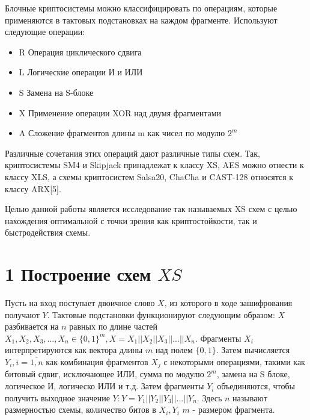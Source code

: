 \documentclass[a4paper,12pt]{extarticle}
\begin{document}
\begin{large}
Блочные криптосистемы можно классифицировать по операциям, которые применяются в тактовых подстановках на каждом фрагменте. Используют следующие операции:

\begin{itemize}
\item R
\newline Операция циклического сдвига
\item L
\newline Логические операции И и ИЛИ
\item S
\newline Замена на S-блоке
\item X
\newline Применение операции XOR над двумя фрагментами
\item A
\newline Сложение фрагментов длины m как чисел по модулю $2^m$
\end{itemize}

Различные сочетания этих операций дают различные типы схем. Так, криптосистемы SM4 и Skipjack принадлежат к классу XS, AES можно отнести к классу XLS, а схемы криптосистем Salsa20, ChaCha и CAST-128 относятся к классу ARX[5].

Целью данной работы является исследование так называемых XS схем с целью нахождения оптимальной с точки зрения как криптостойкости, так и быстродействия схемы.


\newpage
\section*{1 Построение схем $XS$}
\vspace*{1cm}

Пусть на вход поступает двоичное слово $X$, из которого в ходе зашифрования получают $Y$. Тактовые подстановки функционируют следующим образом: $X$ разбивается на $n$ равных по длине частей $X_1, X_2, X_3, ..., X_n \in \{0, 1\}^m, X = X_1||X_2||X_3||...||X_n$. Фрагменты $X_i$ интерпретируются как вектора длины $m$ над полем $\{0, 1\}$. Затем вычисляется $Y_i, i = \overline{1,n}$ как комбинация фрагментов $X_j$ с некоторыми операциями, такими как битовый сдвиг, исключающее ИЛИ, сумма по модулю $2^m$, замена на S блоке, логическое И, логическо ИЛИ и т.д. Затем фрагменты $Y_i$ объединяются, чтобы получить выходное значение $Y: Y = Y_1||Y_2||Y_3||...||Y_n$. Здесь $n$ называют размерностью схемы, количество битов в $X_i, Y_i$ $m$ - размером фрагмента.


\end{large}
\end{document}
